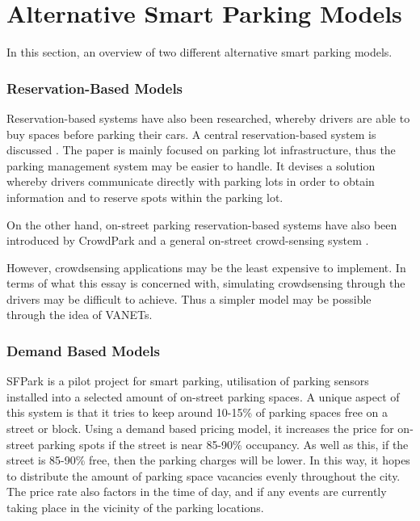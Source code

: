 \section{Alternative Smart Parking Models}
In this section, an overview of two different alternative smart parking models.

\subsubsection{Reservation-Based Models}
Reservation-based systems have also been researched, whereby drivers are able to buy spaces before parking their cars. A central reservation-based system is discussed \citep{2}. The paper is mainly focused on parking lot infrastructure, thus the parking management system may be easier to handle. It devises a solution whereby drivers communicate directly with parking lots in order to obtain information and to reserve spots within the parking lot.

On the other hand, on-street parking reservation-based systems have also been introduced by CrowdPark \citep{8} and a general on-street crowd-sensing system \citep{9}.

However, crowdsensing applications may be the least expensive to implement. In terms of what this essay is concerned with, simulating crowdsensing through the drivers may be difficult to achieve. Thus a simpler model may be possible through the idea of VANETs.

\subsubsection{Demand Based Models}
SFPark \citep{12} is a pilot project for smart parking, utilisation of parking sensors installed into a selected amount of on-street parking spaces. A unique aspect of this system is that it tries to keep around 10-15\% of parking spaces free on a street or block. Using a demand based pricing model, it increases the price for on-street parking spots if the street is near 85-90\% occupancy. As well as this, if the street is 85-90\% free, then the parking charges will be lower. In this way, it hopes to distribute the amount of parking space vacancies evenly throughout the city. The price rate also factors in the time of day, and if any events are currently taking place in the vicinity of the parking locations.